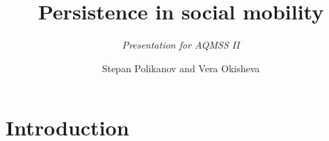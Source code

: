\documentclass[xcolor=dvipsnames, 10pt]{beamer}
\title[UC3M]{Persistence in social mobility}
\subtitle{\vspace{1em}\textit{Presentation for AQMSS II}}
\author[AQMSS II]{Stepan Polikanov and Vera Okisheva}
\date{}
\begin{document}
\begin{frame}
\titlepage
\end{frame}


\section{Introduction}
\end{document}
